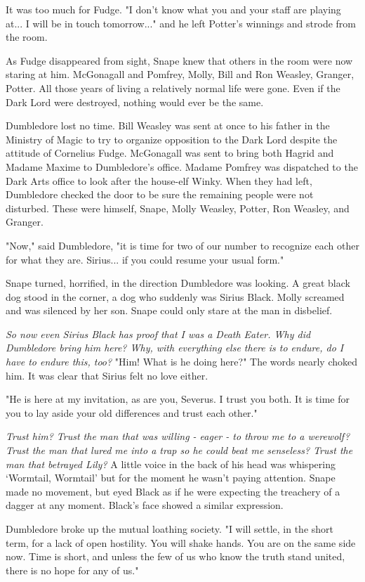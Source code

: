It was too much for Fudge. "I don't know what you and your staff are playing at... I will be in touch tomorrow..." and he left Potter's winnings and strode from the room.

As Fudge disappeared from sight, Snape knew that others in the room were now staring at him. McGonagall and Pomfrey, Molly, Bill and Ron Weasley, Granger, Potter. All those years of living a relatively normal life were gone. Even if the Dark Lord were destroyed, nothing would ever be the same.

Dumbledore lost no time. Bill Weasley was sent at once to his father in the Ministry of Magic to try to organize opposition to the Dark Lord despite the attitude of Cornelius Fudge. McGonagall was sent to bring both Hagrid and Madame Maxime to Dumbledore's office. Madame Pomfrey was dispatched to the Dark Arts office to look after the house-elf Winky. When they had left, Dumbledore checked the door to be sure the remaining people were not disturbed. These were himself, Snape, Molly Weasley, Potter, Ron Weasley, and Granger.

"Now," said Dumbledore, "it is time for two of our number to recognize each other for what they are. Sirius... if you could resume your usual form."

Snape turned, horrified, in the direction Dumbledore was looking. A great black dog stood in the corner, a dog who suddenly was Sirius Black. Molly screamed and was silenced by her son. Snape could only stare at the man in disbelief.

\emph{So now even Sirius Black has proof that I was a Death Eater. Why did Dumbledore bring him here? Why, with everything else there is to endure, do I have to endure this, too?} "Him! What is he doing here?" The words nearly choked him. It was clear that Sirius felt no love either.

"He is here at my invitation, as are you, Severus. I trust you both. It is time for you to lay aside your old differences and trust each other."

\emph{Trust him? Trust the man that was willing - eager - to throw me to a werewolf? Trust the man that lured me into a trap so he could beat me senseless? Trust the man that betrayed Lily?} A little voice in the back of his head was whispering `Wormtail, Wormtail' but for the moment he wasn't paying attention. Snape made no movement, but eyed Black as if he were expecting the treachery of a dagger at any moment. Black's face showed a similar expression.

Dumbledore broke up the mutual loathing society. "I will settle, in the short term, for a lack of open hostility. You will shake hands. You are on the same side now. Time is short, and unless the few of us who know the truth stand united, there is no hope for any of us."

